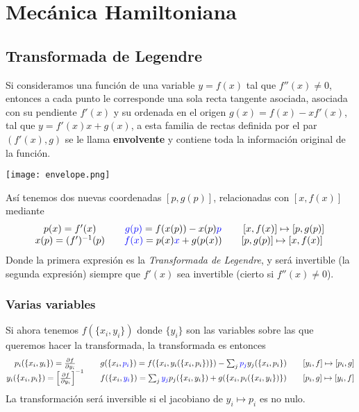 \chapter{Mecánica Hamiltoniana} 
\section{Transformada de Legendre} 
Si consideramos una función de una variable $y=f(x)$ tal que $f''(x)\neq 0$, entonces a cada punto le corresponde una sola recta tangente asociada, asociada con su pendiente $f'(x)$ y su ordenada en el origen $g(x) = f(x)-x f'(x)$, tal que $y = f'(x)x + g(x)$, a esta familia de rectas definida por el par $(f'(x),g)$ se le llama \textbf{envolvente} y contiene toda la información original de la función.
\begin{marginfigure}[0cm]
	\texttt{[image: envelope.png]}
\end{marginfigure}
Así tenemos dos nuevas coordenadas $[p,g(p)]$, relacionadas con $[x,f(x)]$ mediante
\vspace{-5pt}
\begin{equation} \label{4.1.1}
    \begin{matrix}
        p(x)=f'(x) && \color{blue}g(p)\color{black}=f(x(p))-x(p)\color{blue}p\color{black} &&[x,f(x)] \mapsto [p,g(p)] \\
        x(p)=(f')^{-1}(p) &&  \color{blue}f(x) \color{black}=p(x)\color{blue}x\color{black}+g(p(x))  && [p,g(p)] \mapsto [x,f(x)]\
    \end{matrix}
\end{equation} 
Donde la primera expresión es la \textit{Transformada de Legendre}, y será invertible (la segunda expresión) siempre que $f'(x)$ sea invertible (cierto si $f''(x)\neq 0$).
\subsection{Varias variables}
Si ahora tenemos $f(\{x_i,y_i\})$ donde $\{y_i\}$ son las variables sobre las que queremos hacer la transformada, la transformada es entonces
\begin{equation} \label{4.1.2}
    \begin{matrix}
        p_i(\{x_i,y_i\})=\frac{\partial f}{\partial y_i} && g(\{x_i,\color{blue}p_i\color{black}\}) =f(\{x_i,y_i(\{x_i,p_i\})\}) -\sum_j \color{blue}p_j\color{black} y_j(\{x_i,p_i\})  &&[y_i,f] \mapsto [p_i,g] \\
        y_i(\{x_i,p_i\})=\left[\frac{\partial f}{\partial y_i}\right]^{-1} && f(\{x_i,\color{blue}y_i\color{black}\}) =\sum_j \color{blue}y_j\color{black} p_j (\{x_i,y_i\})  +g(\{x_i,p_i(\{x_i,y_i\})\}) &&[p_i,g] \mapsto [y_i,f]\\
    \end{matrix}
\end{equation} 
La transformación será inversible si el jacobiano de $y_i \mapsto p_i$ es no nulo.
